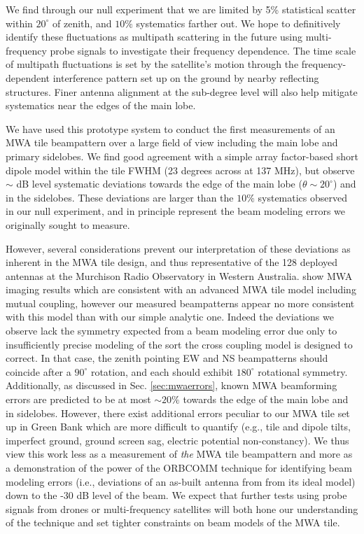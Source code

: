 We find through our null experiment that we are limited by 5\% statistical scatter within $20^\circ$ of zenith, and $10\%$ systematics farther out. We hope to definitively identify these fluctuations as multipath scattering in the future using multi-frequency probe signals to investigate their frequency dependence. The time scale of multipath fluctuations is set by the satellite's motion through the frequency-dependent interference pattern set up on the ground by nearby reflecting structures. Finer antenna alignment at the sub-degree level will also help mitigate systematics near the edges of the main lobe. 

We have used this prototype system to conduct the first measurements of an MWA tile beampattern over a large field of view including the main lobe and primary sidelobes. We find good agreement with a simple array factor-based short dipole model within the tile FWHM (23 degrees across at 137 MHz), but observe $\sim$ dB level systematic deviations towards the edge of the main lobe ($\theta\sim20^\circ$) and in the sidelobes. These deviations are larger than the $10\%$ systematics observed in our null experiment, and in principle represent the beam modeling errors we originally sought to measure. 

However, several considerations prevent our interpretation of these deviations as inherent in the MWA tile design, and thus representative of the 128 deployed antennas at the Murchison Radio Observatory in Western Australia. \citet{sutinjo15} show MWA imaging results which are consistent with an advanced MWA tile model including mutual coupling, however our measured beampatterns appear no more consistent with this model than with our simple analytic one. Indeed the deviations we observe lack the symmetry expected from a beam modeling error due only to insufficiently precise modeling of the sort the cross coupling model is designed to correct. In that case, the zenith pointing EW and NS beampatterns should coincide after a $90^\circ$ rotation, and each should exhibit $180^\circ$ rotational symmetry. Additionally, as discussed in Sec. \ref{sec:mwaerrors}, known MWA beamforming errors are predicted to be at most $\sim20\%$ towards the edge of the main lobe and in sidelobes. However, there exist additional errors peculiar to our MWA tile set up in Green Bank which are more difficult to quantify (e.g., tile and dipole tilts, imperfect ground, ground screen sag, electric potential non-constancy). We thus view this work less as a measurement of \textit{the} MWA tile beampattern and more as a demonstration of the power of the ORBCOMM technique for identifying beam modeling errors (i.e., deviations of an as-built antenna from from its ideal model) down to the -30 dB level of the beam. We expect that further tests using probe signals from drones or multi-frequency satellites will both hone our understanding of the technique and set tighter constraints on beam models of the MWA tile.

